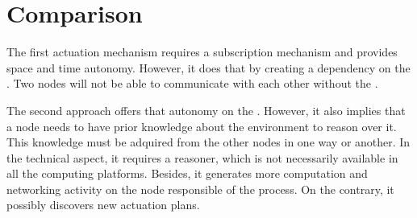 
\section{Comparison}

The first actuation mechanism requires a subscription mechanism and provides space and time autonomy.
However, it does that by creating a dependency on the \space{}.
Two nodes will not be able to communicate with each other without the \space{}.


The second approach offers that autonomy on the \space{}.
However, it also implies that a node needs to have prior knowledge about the environment to reason over it.
This knowledge must be adquired from the other nodes in one way or another.
In the technical aspect, it requires a reasoner, which is not necessarily available in all the computing platforms.
Besides, it generates more computation and networking activity on the node responsible of the process.
On the contrary, it possibly discovers new actuation plans.




